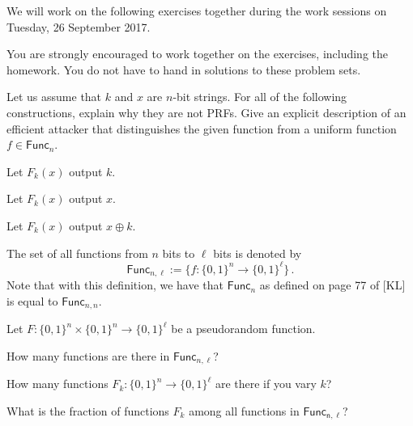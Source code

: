 \documentclass[a4paper,10pt,landscape,twocolumn]{scrartcl}
\newcommand\worksession{Tuesday, 26 September 2017}
\begin{document}
\problems


{\sffamily\noindent
We will work on the following exercises together during the work sessions on \worksession.

You are strongly encouraged to work together on the exercises, including the homework. You do not have to hand in solutions to these problem sets.}



\begin{exercise}
Let us assume that $k$ and $x$ are $n$-bit strings. For all of the following constructions, explain why they are not PRFs. Give an explicit description of an efficient attacker that distinguishes the given function from a uniform function $f \in \mathsf{Func}_n$.

\begin{subex}
Let $F_k(x)$ output $k$.
\end{subex}

\begin{subex}
Let $F_k(x)$ output $x$.
\end{subex}

\begin{subex}
Let $F_k(x)$ output $x \oplus k$.
\end{subex}

\end{exercise}

\begin{exercise}
The set of all functions from $n$ bits to $\ell$ bits is denoted by
\[ \mathsf{Func}_{n,\ell} := \big\{f:\{0,1\}^n \rightarrow \{0,1\}^{\ell} \big\} \, .
\]
Note that with this definition, we have that $\mathsf{Func}_n$ as defined on page 77 of [KL] is equal to $\mathsf{Func}_{n,n}$.

Let $F:\{0,1\}^n \times \{0,1\}^n \rightarrow \{0,1\}^\ell$ be a pseudorandom function.

\begin{subex}
How many functions are there in $\mathsf{Func}_{n,\ell}$?
\end{subex}

\begin{subex}
How many functions $F_k:\{0,1\}^n \rightarrow \{0,1\}^\ell$ are there if you vary $k$?
\end{subex}

\begin{subex}
What is the fraction of functions $F_k$ among all functions in $\mathsf{Func_{n,\ell}}$?
\end{subex}

\end{exercise}
\end{document}
